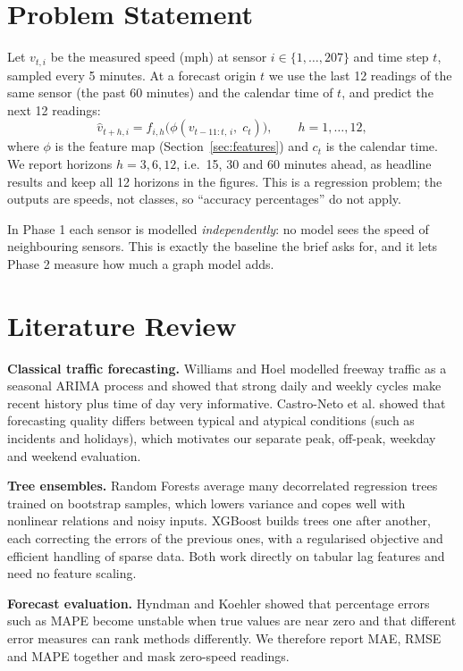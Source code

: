\documentclass[conference]{IEEEtran}
\begin{document}
\section{Problem Statement}
Let $v_{t,i}$ be the measured speed (mph) at sensor $i\in\{1,\dots,207\}$ and time step $t$, sampled every 5 minutes. At a forecast origin $t$ we use the last 12 readings of the same sensor (the past 60 minutes) and the calendar time of $t$, and predict the next 12 readings:
\begin{equation}
\hat v_{t+h,i}=f_{i,h}\big(\phi(v_{t-11:t,\,i},\;c_t)\big),\qquad h=1,\dots,12,
\end{equation}
where $\phi$ is the feature map (Section~\ref{sec:features}) and $c_t$ is the calendar time. We report horizons $h=3,6,12$, i.e.\ 15, 30 and 60 minutes ahead, as headline results and keep all 12 horizons in the figures. This is a regression problem; the outputs are speeds, not classes, so ``accuracy percentages'' do not apply.

In Phase 1 each sensor is modelled \emph{independently}: no model sees the speed of neighbouring sensors. This is exactly the baseline the brief asks for, and it lets Phase 2 measure how much a graph model adds.

\section{Literature Review}
\label{sec:lit}
\textbf{Classical traffic forecasting.} Williams and Hoel \cite{williams} modelled freeway traffic as a seasonal ARIMA process and showed that strong daily and weekly cycles make recent history plus time of day very informative. Castro-Neto et al. \cite{castro} showed that forecasting quality differs between typical and atypical conditions (such as incidents and holidays), which motivates our separate peak, off-peak, weekday and weekend evaluation.

\textbf{Tree ensembles.} Random Forests \cite{breiman} average many decorrelated regression trees trained on bootstrap samples, which lowers variance and copes well with nonlinear relations and noisy inputs. XGBoost \cite{chen} builds trees one after another, each correcting the errors of the previous ones, with a regularised objective and efficient handling of sparse data. Both work directly on tabular lag features and need no feature scaling.

\textbf{Forecast evaluation.} Hyndman and Koehler \cite{hyndman} showed that percentage errors such as MAPE become unstable when true values are near zero and that different error measures can rank methods differently. We therefore report MAE, RMSE and MAPE together and mask zero-speed readings.
\end{document}
